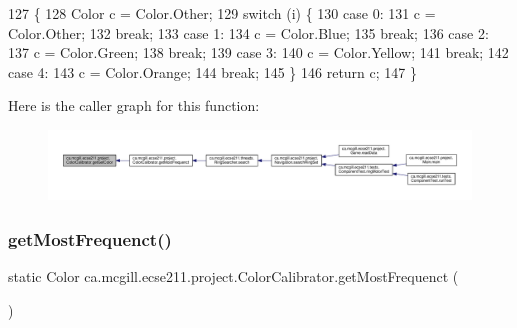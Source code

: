 \begin{DoxyCode}
127                                          \{
128     Color c = Color.Other;
129     \textcolor{keywordflow}{switch} (i) \{
130       \textcolor{keywordflow}{case} 0:
131         c = Color.Other;
132         \textcolor{keywordflow}{break};
133       \textcolor{keywordflow}{case} 1: 
134         c = Color.Blue;
135         \textcolor{keywordflow}{break};
136       \textcolor{keywordflow}{case} 2:
137         c = Color.Green;
138         \textcolor{keywordflow}{break};
139       \textcolor{keywordflow}{case} 3:
140         c = Color.Yellow;
141         \textcolor{keywordflow}{break};
142       \textcolor{keywordflow}{case} 4:
143         c = Color.Orange;
144         \textcolor{keywordflow}{break};
145     \}
146     \textcolor{keywordflow}{return} c;
147   \}
\end{DoxyCode}
Here is the caller graph for this function\+:
\nopagebreak
\begin{figure}[H]
\begin{center}
\leavevmode
\includegraphics[width=350pt]{classca_1_1mcgill_1_1ecse211_1_1project_1_1_color_calibrator_acb1d9cef0739971dbe00cc16712be0fe_icgraph}
\end{center}
\end{figure}
\mbox{\label{classca_1_1mcgill_1_1ecse211_1_1project_1_1_color_calibrator_a3d65927aaa2041f933dbdc19c3d2a412}} 
\subsubsection{\texorpdfstring{get\+Most\+Frequenct()}{getMostFrequenct()}}
{\footnotesize\ttfamily static Color ca.\+mcgill.\+ecse211.\+project.\+Color\+Calibrator.\+get\+Most\+Frequenct (\begin{DoxyParamCaption}{ }\end{DoxyParamCaption})\hspace{0.3cm}{\ttfamily [static]}}

